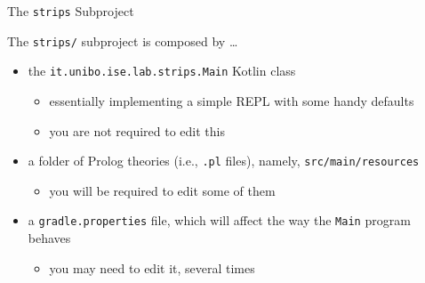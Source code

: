 \documentclass[presentation]{beamer}\mode<presentation>{\usetheme{AMSBolognaFC}}
\begin{document}
\begin{frame}{The \texttt{strips} Subproject}

The \texttt{strips/} subproject is composed by \ldots{}
%
\vfill
%
\begin{itemize}
    \item the \texttt{it.unibo.ise.lab.strips.\alert{Main}} Kotlin class
    \begin{itemize}
        \item essentially implementing a simple REPL with some handy defaults
        \item you are not required to edit this
    \end{itemize}

    \vfill

    \item a folder of Prolog theories (i.e., \texttt{.pl} files), namely, \texttt{src/main/\alert{resources}}
    \begin{itemize}
        \item you will be required to edit some of them
    \end{itemize}

    \vfill

    \item a \texttt{gradle\alert{.properties}} file, which will affect the way the \texttt{Main} program behaves
    \begin{itemize}
        \item you may need to edit it, several times
    \end{itemize}
\end{itemize}
\end{frame}
\end{document}
